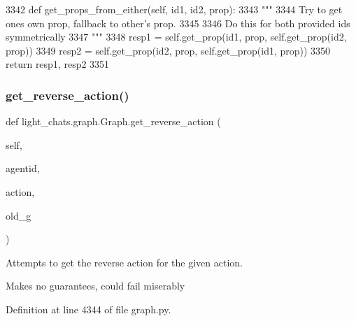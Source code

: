 \begin{DoxyCode}
3342     \textcolor{keyword}{def }get\_props\_from\_either(self, id1, id2, prop):
3343         \textcolor{stringliteral}{"""}
3344 \textcolor{stringliteral}{        Try to get ones own prop, fallback to other's prop.}
3345 \textcolor{stringliteral}{}
3346 \textcolor{stringliteral}{        Do this for both provided ids symmetrically}
3347 \textcolor{stringliteral}{        """}
3348         resp1 = self.get\_prop(id1, prop, self.get\_prop(id2, prop))
3349         resp2 = self.get\_prop(id2, prop, self.get\_prop(id1, prop))
3350         \textcolor{keywordflow}{return} resp1, resp2
3351 
\end{DoxyCode}
\mbox{\label{classlight__chats_1_1graph_1_1Graph_a7b3fe43bf1e2b53fe7a2e22a24d77ef2}} 
\subsubsection{\texorpdfstring{get\+\_\+reverse\+\_\+action()}{get\_reverse\_action()}}
{\footnotesize\ttfamily def light\+\_\+chats.\+graph.\+Graph.\+get\+\_\+reverse\+\_\+action (\begin{DoxyParamCaption}\item[{}]{self,  }\item[{}]{agentid,  }\item[{}]{action,  }\item[{}]{old\+\_\+g }\end{DoxyParamCaption})}

\begin{DoxyVerb}Attempts to get the reverse action for the given action.

Makes no guarantees, could fail miserably
\end{DoxyVerb}
 

Definition at line 4344 of file graph.\+py.


